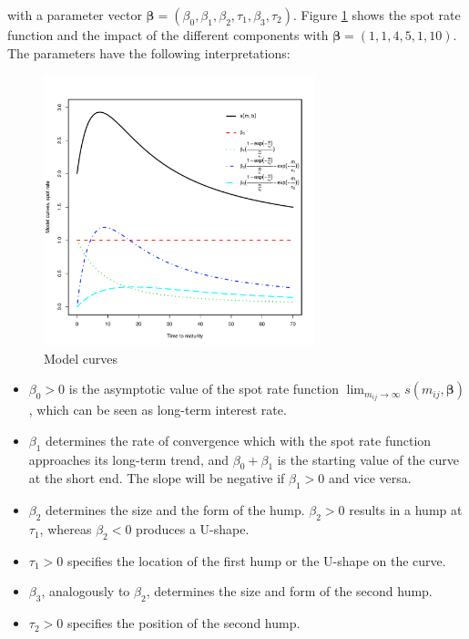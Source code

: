 with a parameter vector ${\bm{\beta}} = \left(\beta_0,\beta_1,\beta_2,\tau_1,\beta_3,\tau_2\right)$. Figure \ref{fig:modelcurves} shows the \cite{Svensson1994} spot rate function and the impact of the different components with $\bm{\beta} = (1, 1, 4, 5, 1, 10)$. The parameters have the following interpretations:

%

\begin{figure}[htb]
\centering
  \caption{Model curves}
 \label{fig:modelcurves}
\includegraphics[width=0.7\textwidth]{curveshape}
\end{figure}

\begin{itemize}
\item $\beta_0>0$ is the asymptotic value of the spot rate function $\lim_{m_{ij}\to\infty}s(m_{ij},\bm{\beta})$, which can be seen as long-term interest rate.
\item $\beta_1$ determines the rate of convergence which with the spot rate function approaches its long-term trend, and $\beta_0+\beta_1$ is the starting value of the curve at the short end. The slope will be negative if $\beta_1>0$ and vice versa.
\item $\beta_2$ determines the size and the form of the hump. $\beta_2 >0$  results in a hump at  $\tau_1$, whereas $\beta_2<0$ produces a U-shape.
\item $\tau_1>0$ specifies the location of the first hump or the U-shape on the curve.
\item $\beta_3$, analogously to $\beta_2$, determines the size and form of the second hump.
\item $\tau_2>0$ specifies the position of the second hump.
\end{itemize}

